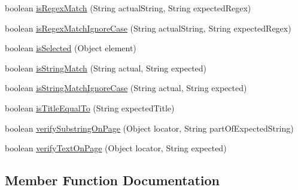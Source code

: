 \begin{DoxyCompactItemize}
\item 
boolean \hyperlink{interfacecom_1_1zeuslearning_1_1automation_1_1interactions_1_1IVerifications_ac9e92358d7f62a1cf1c2760ada26cde9}{is\+Regex\+Match} (String actual\+String, String expected\+Regex)
\item 
boolean \hyperlink{interfacecom_1_1zeuslearning_1_1automation_1_1interactions_1_1IVerifications_a7d5af24aac4cb26bca024a0b19c56dad}{is\+Regex\+Match\+Ignore\+Case} (String actual\+String, String expected\+Regex)
\item 
boolean \hyperlink{interfacecom_1_1zeuslearning_1_1automation_1_1interactions_1_1IVerifications_a5525ec4429db243e34b16151f78fa2d9}{is\+Selected} (Object element)
\item 
boolean \hyperlink{interfacecom_1_1zeuslearning_1_1automation_1_1interactions_1_1IVerifications_a0851452498cc023e1c68afdd95b23912}{is\+String\+Match} (String actual, String expected)
\item 
boolean \hyperlink{interfacecom_1_1zeuslearning_1_1automation_1_1interactions_1_1IVerifications_a9ff9d7c332e151b80a80396d264d1cd5}{is\+String\+Match\+Ignore\+Case} (String actual, String expected)
\item 
boolean \hyperlink{interfacecom_1_1zeuslearning_1_1automation_1_1interactions_1_1IVerifications_a5174c7c27f09f3833d34dafc34b92ac8}{is\+Title\+Equal\+To} (String expected\+Title)
\item 
boolean \hyperlink{interfacecom_1_1zeuslearning_1_1automation_1_1interactions_1_1IVerifications_a0fa329dc2ffd80c2bb9afe685ef95bea}{verify\+Substring\+On\+Page} (Object locator, String part\+Of\+Expected\+String)
\item 
boolean \hyperlink{interfacecom_1_1zeuslearning_1_1automation_1_1interactions_1_1IVerifications_a2947831d2ac8783dd93e5fec4c33ebdd}{verify\+Text\+On\+Page} (Object locator, String expected)
\end{DoxyCompactItemize}


\subsection{Member Function Documentation}
\hypertarget{interfacecom_1_1zeuslearning_1_1automation_1_1interactions_1_1IVerifications_ace567c4e2269a32d10805e3269679713}{}\label{interfacecom_1_1zeuslearning_1_1automation_1_1interactions_1_1IVerifications_ace567c4e2269a32d10805e3269679713} 
